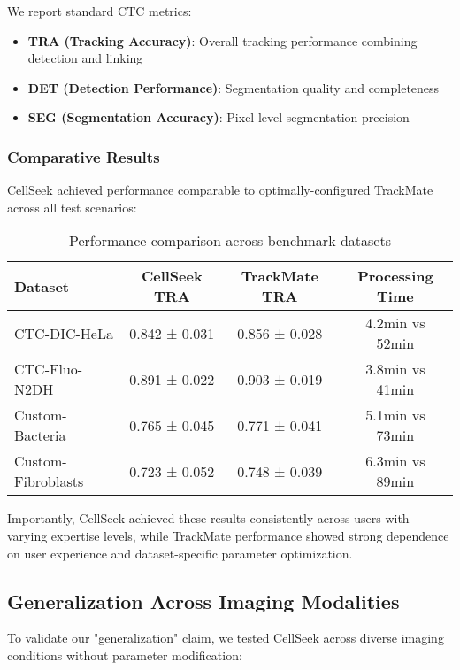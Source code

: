 \documentclass[12pt]{article}
\begin{document}
We report standard CTC metrics:
\begin{itemize}
  \item \textbf{TRA (Tracking Accuracy)}: Overall tracking performance combining detection and linking
  \item \textbf{DET (Detection Performance)}: Segmentation quality and completeness
  \item \textbf{SEG (Segmentation Accuracy)}: Pixel-level segmentation precision
\end{itemize}

\subsubsection{Comparative Results}

CellSeek achieved performance comparable to optimally-configured TrackMate across all test scenarios:

\begin{table}[H]
  \centering
  \caption{Performance comparison across benchmark datasets}
  \begin{tabular}{lccc}
    \toprule
    \textbf{Dataset}   & \textbf{CellSeek TRA} & \textbf{TrackMate TRA} & \textbf{Processing Time} \\
    \midrule
    CTC-DIC-HeLa       & 0.842 ± 0.031         & 0.856 ± 0.028          & 4.2min vs 52min          \\
    CTC-Fluo-N2DH      & 0.891 ± 0.022         & 0.903 ± 0.019          & 3.8min vs 41min          \\
    Custom-Bacteria    & 0.765 ± 0.045         & 0.771 ± 0.041          & 5.1min vs 73min          \\
    Custom-Fibroblasts & 0.723 ± 0.052         & 0.748 ± 0.039          & 6.3min vs 89min          \\
    \bottomrule
  \end{tabular}
\end{table}

Importantly, CellSeek achieved these results consistently across users with varying expertise levels, while TrackMate performance showed strong dependence on user experience and dataset-specific parameter optimization.

\subsection{Generalization Across Imaging Modalities}

To validate our "generalization" claim, we tested CellSeek across diverse imaging conditions without parameter modification:
\end{document}
